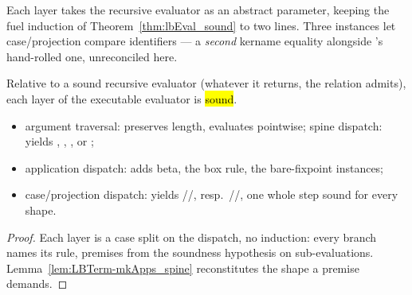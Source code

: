 \begin{remark}
 Each layer takes the recursive evaluator as an abstract parameter, keeping the fuel induction of Theorem~\ref{thm:lbEval_sound} to two lines. Three  instances let case/projection compare identifiers --- a \emph{second} kername equality alongside 's hand-rolled one, unreconciled here.
\end{remark}

\begin{lemma}
\label{lem:lbEvalStep_sound}
\leanok
{}
 Relative to a sound recursive evaluator (whatever it returns, the relation admits), each layer of the executable evaluator is \hl{sound}.
\begin{itemize}
\item argument traversal: preserves length, evaluates pointwise; spine dispatch: yields , , , or ;
\item application dispatch: adds beta, the box rule, the bare-fixpoint instances;
\item case/projection dispatch: yields //, resp.\ //, one whole step sound for every shape.
\end{itemize}
\end{lemma}
\begin{proof}
\leanok
{}
 Each layer is a case split on the dispatch, no induction: every branch names its rule, premises from the soundness hypothesis on sub-evaluations. Lemma~\ref{lem:LBTerm-mkApps_spine} reconstitutes the  shape a premise demands.
\end{proof}

